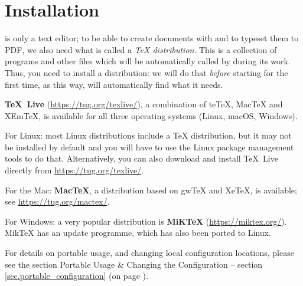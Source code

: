 
\chapter{Installation}
\label{chap.installation}

\Tw{} is only a text editor; to be able to create documents with \AllTeX{} and to typeset them to PDF, we also need what is called a \emph{{\TeX} distribution}. This is a collection of programs and other files which will be automatically called by {\Tw} during its work. Thus, you need to install a distribution: we will do that \emph{before} starting {\Tw} for the first time, as this way, {\Tw} will automatically find what it needs.

\textbf{TeX~Live} (\url{https://tug.org/texlive/}), a combination of teTeX, MacTeX and XEmTeX, is available for all three operating systems (Linux, macOS, Windows).

\begin{OSLinux}
For Linux: most Linux distributions include a {\TeX} distribution, but it may not be installed by default and you will have to use the Linux package management tools to do that. Alternatively, you can also download and install TeX~Live directly from \url{https://tug.org/texlive/}.
\end{OSLinux}

\begin{OSMac}
For the Mac: \textbf{MacTeX}, a distribution based on gwTeX and XeTeX, is available; see \url{https://tug.org/mactex/}.
\end{OSMac}

\begin{OSWindows}
For Windows: a very popular distribution is \textbf{MiKTeX} (\url{https://miktex.org/}). MikTeX has an update programme, which has also been ported to Linux.
\end{OSWindows}

For details on portable usage, and changing local configuration locations, please see the section Portable Usage \& Changing the Configuration -- section \ref{sec.portable_configuration} (on page \pageref{sec.portable_configuration}).


